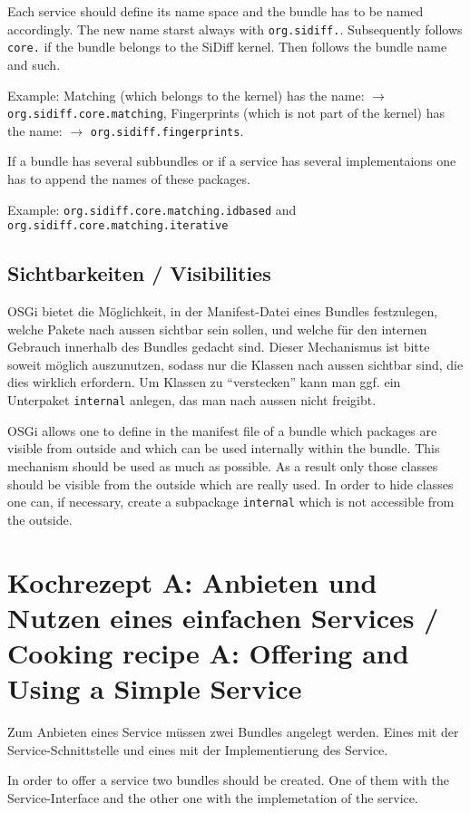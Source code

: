 \documentclass[10pt,a4paper]{scrartcl}
\providecommand{\deng}[2]{#1 / {\sffamily #2}}
\providecommand{\deutsch}[1]{#1}
\providecommand{\englisch}[1]{{\sffamily #1}}
\begin{document}
\englisch{Each service should define its name space and the bundle has to be
named accordingly. The new name starst always with \texttt{org.sidiff.}.
Subsequently follows \texttt{core.} if the bundle belongs to the SiDiff kernel.
Then follows the bundle name and such.

Example: Matching (which belongs to the kernel) has the name: $\to$
\texttt{org.sidiff.core.matching}, Fingerprints (which is not part of the
kernel) has the name: $\to$ \texttt{org.sidiff.fingerprints}.

If a bundle has several subbundles or if a service has several implementaions
one has to append the names of these packages.

Example: \texttt{org.sidiff.core.matching.idbased} and
\texttt{org.sidiff.core.matching.iterative}
}

\subsection{\deng{Sichtbarkeiten}{Visibilities}}
\deutsch{OSGi bietet die Möglichkeit, in der Manifest-Datei eines Bundles festzulegen,
welche Pakete nach aussen sichtbar sein sollen, und welche für den internen
Gebrauch innerhalb des Bundles gedacht sind. Dieser Mechanismus ist bitte soweit
möglich auszunutzen, sodass nur die Klassen nach aussen sichtbar sind, die dies
wirklich erfordern. Um Klassen zu ``verstecken'' kann man ggf. ein Unterpaket
\texttt{internal} anlegen, das man nach aussen nicht freigibt.}

\englisch{OSGi allows one to define in the manifest file of a bundle which
packages are visible from outside and which can be used internally within the
bundle. This mechanism should be used as much as possible. As a result only
those classes should be visible from the outside which are really used. In order
to hide classes one can, if necessary, create a subpackage \texttt{internal}
which is not accessible from the outside.}




\clearpage
\section{\deng{Kochrezept A: Anbieten und Nutzen eines einfachen Services}{Cooking recipe A: Offering and Using a Simple Service}}
\deutsch{Zum Anbieten eines Service müssen zwei Bundles angelegt werden. Eines mit der 
Service-Schnittstelle und eines mit der Implementierung des Service.}

\englisch{In order to offer a service two bundles should be created. One of them with the Service-Interface and the other one with the implemetation of the service.}
\end{document}
